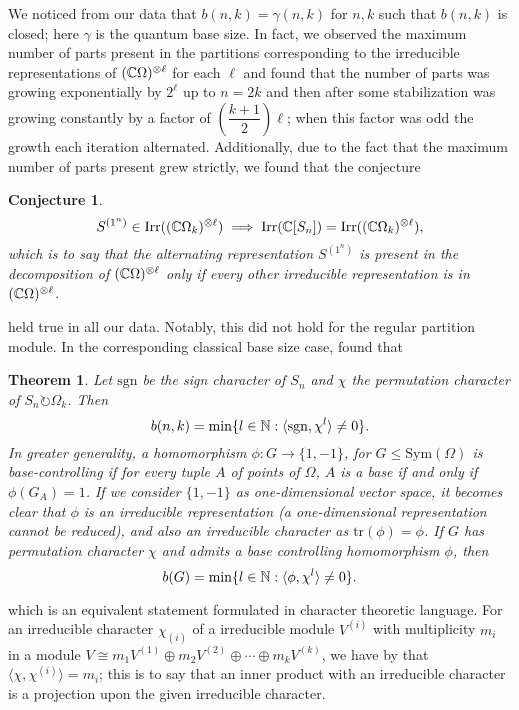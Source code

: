 \documentclass[12pt,twoside]{reedthesis}
\theoremstyle{plain}   %
\newtheorem{thm}{Theorem}[section] %
\newtheorem{conj}{Conjecture}[section]
\theoremstyle{definition}
\theoremstyle{remark}
\numberwithin{equation}{section}
\def\tr{\mathrm{tr}}
\def\irr{\mathrm{Irr}}
\def\acts{\circlearrowright} %
\begin{document}
We noticed from our data that $b(n,k) = \gamma(n,k)$ for $n,k$ such that $b(n,k)$ is closed; here $\gamma$ is the quantum base size.
In fact, we observed the maximum number of parts present in the partitions corresponding to the irreducible representations of $(\mathbb{C} \Omega)^{\otimes \ell}$ for each $\ell$ and found that the number
of parts was growing exponentially by $2^\ell$ up to $n = 2k$ and then after some stabilization was growing constantly by a factor of $(\dfrac{k+1}{2})\ell$; when this factor was odd the growth each iteration alternated.
Additionally, due to the fact that the maximum number of parts present grew strictly, we found that the conjecture
\begin{conj}
  \[S^{(1^n)} \in \irr((\CC \Omega_k)^{\otimes \ell}) \implies \irr(\CC [S_n]) = \irr((\CC \Omega_k)^{\otimes \ell}),\]
  which is to say that the alternating representation $S^{(1^n)}$ is present in the decomposition of $(\mathbb{C} \Omega)^{\otimes \ell}$ only if every other irreducible representation is in $(\mathbb{C} \Omega)^{\otimes \ell}$.
\end{conj}
held true in all our data. Notably, this did not hold for the regular partition module.
In the corresponding classical base size case, \cite{valle24} found that
\begin{thm}
  Let $\mathrm{sgn}$ be the sign character of $S_n$ and $\chi$ the permutation character of $S_n \acts \Omega_k$. Then
  \[ b(n,k) = \min \{ l \in \mathbb{N}: \langle \mathrm{sgn}, \chi^l \rangle \neq 0 \}.\]
  In greater generality, a homomorphism $\phi: G \to \{1,-1\}$, for $G \leq \mathrm{Sym}(\Omega)$ is \emph{base-controlling} if for every tuple $A$ of points of $\Omega$, $A$ is a base if and only if $\phi(G_A) = 1$.
  If we consider $\{1,-1\}$ as one-dimensional vector space, it becomes clear that $\phi$ is an irreducible representation (a one-dimensional representation cannot be reduced), and also an irreducible character as $\tr(\phi) = \phi$.
  If $G$ has permutation character $\chi$ and admits a base controlling homomorphism $\phi$, then
  \[  b(G) = \min \{ l \in \mathbb{N}: \langle \phi, \chi^l \rangle \neq 0 \}.\]
\end{thm}
which is an equivalent statement formulated in character theoretic language.
For an irreducible character $\chi_{(i)}$ of a irreducible module $V^{(i)}$ with multiplicity $m_i$ in a module $V \cong m_1V^{(1)} \oplus m_2V^{(2)} \oplus \cdots \oplus m_kV^{(k)}$, we have by \cite[Cor. 1.9.4]{sagan}
that $\langle \chi, \chi^{(i)} \rangle = m_i$;
this is to say that an inner product with an irreducible character is a projection upon the given irreducible character.
\end{document}
